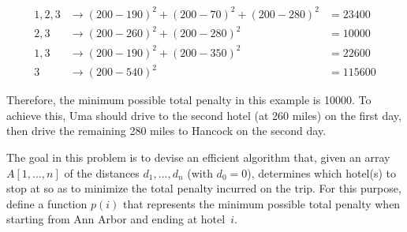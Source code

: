 \documentclass[11pt,addpoints,answers]{exam}
\begin{document}
\begin{questions}
  \begin{align*}
  1, 2, 3 &\rightarrow (200 - 190)^2 + (200 - 70)^2 + (200 - 280)^2 &= 23400 \\
  2, 3 &\rightarrow (200 - 260)^2 + (200 - 280)^2 &= 10000 \\
  1,3 &\rightarrow (200 - 190)^2 + (200 - 350)^2 &= 22600 \\
  3 &\rightarrow (200 - 540)^2 &= 115600
  \end{align*}

  Therefore, the minimum possible total penalty in this example is 10000.
  To achieve this, Uma should drive to the second hotel (at 260 miles) on the first day, then drive the remaining 280 miles to Hancock on the second day.

  The goal in this problem is to devise an efficient algorithm that, given an array $A[1,\ldots, n]$ of the distances $d_1, \ldots, d_n$ (with $d_0=0$), determines which hotel(s) to stop at so as to minimize the total penalty incurred on the trip.
  For this purpose, define a function $p(i)$ that represents the minimum possible total penalty when starting from Ann Arbor and ending at hotel~$i$.

\end{questions}
\end{document}
